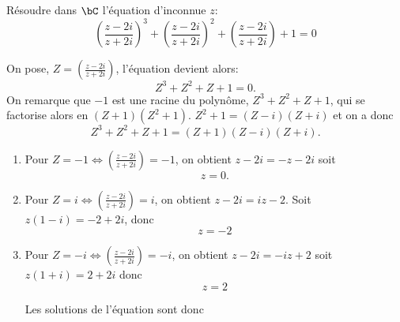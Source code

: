 


\begin{exercice}
Résoudre dans $\bC$ l'équation d'inconnue $z$: 
$$\left(\frac{z-2i}{z+2i}\right)^3+\left(\frac{z-2i}{z+2i}\right)^2+\left(\frac{z-2i}{z+2i}\right)+1=0$$
\end{exercice}


\begin{correction}
On pose, $Z =\left(\frac{z-2i}{z+2i}\right)$, l'équation devient alors: 
$$Z^3+Z^2+Z+1=0.$$
On  remarque que $-1$ est une racine du polynôme,   $Z^3+Z^2+Z+1$, qui se factorise alors en 
$(Z+1)(Z^2+1)$. $Z^2+1 =(Z-i)(Z+i)$ et on  a donc 
$$Z^3+Z^2+Z+1 =(Z+1)(Z-i)(Z+i).$$

\begin{enumerate}
\item Pour $Z=-1 \Longleftrightarrow \left(\frac{z-2i}{z+2i}\right)=-1$, on obtient 
$z-2i =-z-2i$ soit $$z=0.$$
\item Pour $Z=i \Longleftrightarrow \left(\frac{z-2i}{z+2i}\right)=i$, on obtient 
$z-2i =iz-2$. Soit $z(1-i) = -2+2i$, donc 
$$z=-2$$


\item Pour $Z=-i \Longleftrightarrow \left(\frac{z-2i}{z+2i}\right)=-i$, on obtient 
$z-2i =-iz+2$ soit $z(1+i) =2+2i$ donc 
$$z=2$$



Les solutions de l'équation sont donc 

\end{enumerate}



\end{correction}